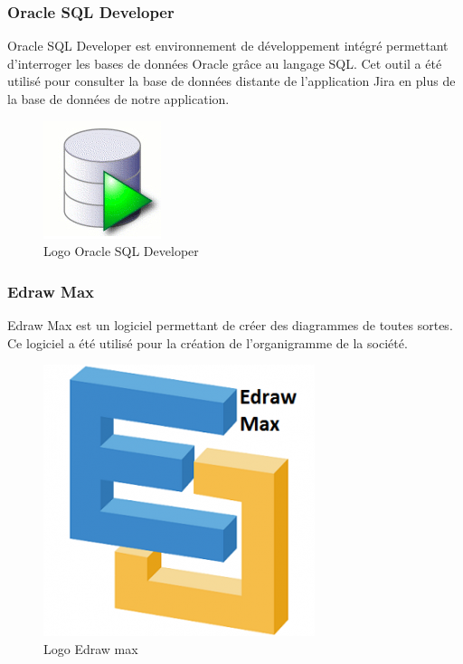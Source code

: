 \subsubsection{Oracle SQL Developer}
\noindent\begin{minipage}{0.69\textwidth}
Oracle SQL Developer est environnement de développement intégré permettant d'interroger les bases de données Oracle grâce au langage SQL. Cet outil a été utilisé pour consulter la base de données distante de l'application Jira en plus de la base de données de notre application.
\end{minipage}
\begin{minipage}{0.3\textwidth}
\begin{figure}[H]
  \centering
  \includegraphics[scale=0.5]{figures/logo/orclsqldev3.jpg}
  \caption{Logo Oracle SQL Developer}
  \label{code23}
\end{figure}
\end{minipage}
\subsubsection{Edraw Max}
\noindent\begin{minipage}{0.69\textwidth}
Edraw Max est un logiciel permettant de créer des diagrammes de toutes sortes. Ce logiciel a été utilisé pour la création de l'organigramme de la société.
\end{minipage}
\begin{minipage}{0.3\textwidth}
\begin{figure}[H]
  \centering
  \includegraphics[scale=0.25]{figures/logo/edraw_max.png}
  \caption{Logo Edraw max}
  \label{code24}
\end{figure}
\end{minipage}
